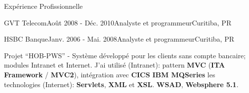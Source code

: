 \documentclass{resume}
\begin{document}
\begin{rSection}{Expérience Profissionnelle}
\begin{rSubsection}{GVT Telecom}{Août 2008 - Déc. 2010}{Analyste et programmeur}{Curitiba, PR}
    \end{rSubsection}
    \begin{rSubsection}{HSBC Banque}{Janv. 2006 - Mai. 2008}{Analyste et programmeur}{Curitiba, PR}
    \item Projet “HOB-PWS” - Système développé pour les clients sans compte bancaire; modules Intranet et Internet. J’ai utilisé (Intranet): pattern \textbf{MVC} (\textbf{ITA Framework} / \textbf{MVC2}), intégration avec \textbf{CICS} \textbf{IBM MQSeries} les technologies (Internet): \textbf{Servlets}, \textbf{XML} et \textbf{XSL}. \textbf{WSAD}, \textbf{Websphere 5.1}.\\

\end{rSubsection}
\end{rSection}
\end{document}
